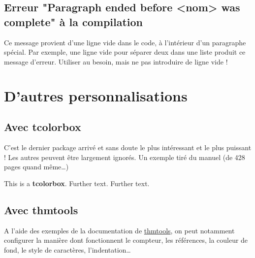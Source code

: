 \subsection{Erreur "Paragraph ended before <nom> was complete" à la compilation}

Ce message provient d'une ligne vide dans le code, à l'intérieur d'un paragraphe spécial. Par exemple, une ligne vide pour séparer deux \inlatex{\item} dans une liste produit ce message d'erreur. Utiliser \inlatex{\\} au besoin, mais ne pas introduire de ligne vide !





\section{D'autres personnalisations}



\subsection{Avec tcolorbox}

C'est le dernier package arrivé et sans doute le plus intéressant et le plus puissant ! Les autres peuvent être largement ignorés. Un exemple tiré du manuel (de 428 pages quand même\dots)

\begin{LTXexample}[pos=o]
	\begin{tcolorbox}[title=My title,
		colback=red!5!white,
		colframe=red!75!black,
		colbacktitle=yellow!50!red,
		coltitle=red!25!black,
		fonttitle=\bfseries,
		subtitle style={boxrule=0.4pt,
			colback=yellow!50!red!25!white} ]
		This is a \textbf{tcolorbox}.
		Further text.
		Further text.
	\end{tcolorbox}
\end{LTXexample}


\subsection{Avec thmtools}

A l'aide des exemples de la documentation de \href{http://mirror.ctan.org/macros/latex/exptl/thmtools/thmtools.pdf}{thmtools}, on peut notamment configurer la manière dont fonctionnent le compteur, les références, la couleur de fond, le style de caractères, l'indentation\dots


